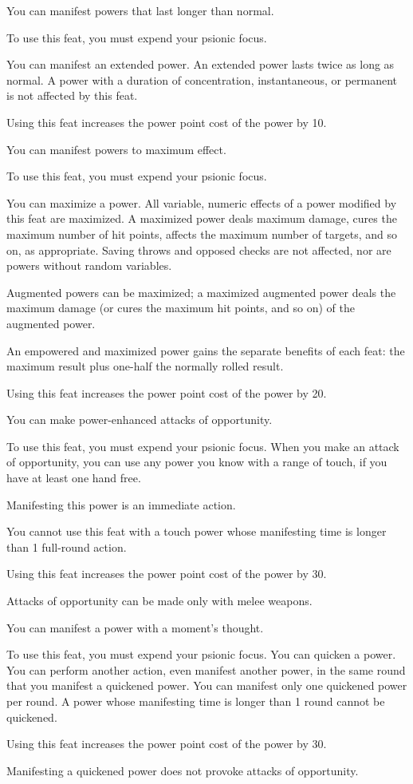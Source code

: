 {You can manifest powers that last longer than normal.}
{}
{To use this feat, you must expend your psionic focus.

You can manifest an extended power. An extended power lasts twice as long as normal. A power with a duration of concentration, instantaneous, or permanent is not affected by this feat.

Using this feat increases the power point cost of the power by 10.}{}{}

{You can manifest powers to maximum effect.}
{}
{To use this feat, you must expend your psionic focus.

You can maximize a power. All variable, numeric effects of a power modified by this feat are maximized. A maximized power deals maximum damage, cures the maximum number of hit points, affects the maximum number of targets, and so on, as appropriate. Saving throws and opposed checks are not affected, nor are powers without random variables.

Augmented powers can be maximized; a maximized augmented power deals the maximum damage (or cures the maximum hit points, and so on) of the augmented power.

An empowered and maximized power gains the separate benefits of each feat: the maximum result plus one-half the normally rolled result.

Using this feat increases the power point cost of the power by 20.}{}{}

{You can make power-enhanced attacks of opportunity.}
{}
{To use this feat, you must expend your psionic focus. When you make an attack of opportunity, you can use any power you know with a range of touch, if you have at least one hand free.

Manifesting this power is an immediate action.

You cannot use this feat with a touch power whose manifesting time is longer than 1 full-round action.

Using this feat increases the power point cost of the power by 30.}
{Attacks of opportunity can be made only with melee weapons.}{}

{You can manifest a power with a moment's thought.}
{}
{To use this feat, you must expend your psionic focus. You can quicken a power. You can perform another action, even manifest another power, in the same round that you manifest a quickened power. You can manifest only one quickened power per round. A power whose manifesting time is longer than 1 round cannot be quickened.

Using this feat increases the power point cost of the power by 30.

Manifesting a quickened power does not provoke attacks of opportunity.}{}{}

